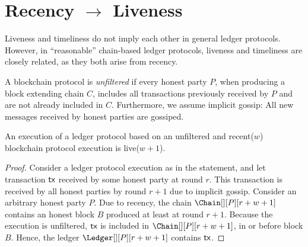\section{Recency $\rightarrow$ Liveness}\label{appendix:recency-liveness}

Liveness and timeliness do not imply each other in general ledger protocols.
However, in ``reasonable'' chain-based ledger protocols, liveness and
timeliness are closely related, as they both arise from recency.

\begin{definition}[Unfiltered]
  A blockchain protocol is \emph{unfiltered} if every honest party $P$,
  when producing a block extending chain $C$, includes all transactions
  previously received by $P$ and are not already included in $C$.
  Furthermore, we assume implicit gossip: All new messages received by honest
  parties are gossiped.
\end{definition}

\begin{theorem}
An execution of a ledger protocol based on an unfiltered and recent($w$)
blockchain protocol execution is live($w + 1$).
\end{theorem}
\begin{proof}
  Consider a ledger protocol execution as in the statement,
  and let transaction $\textsf{tx}$ received by some honest party at round $r$.
  This transaction is received by all honest parties by round $r + 1$ due
  to implicit gossip. Consider an arbitrary honest party $P$. Due to recency,
  the chain $\Chain[][P][r + w + 1]$ contains an honest block $B$ produced at
  least at round $r + 1$. Because the execution is unfiltered, $\textsf{tx}$
  is included in $\Chain[][P][r + w + 1]$, in or before block $B$.
  Hence, the ledger $\Ledger[][P][r + w + 1]$ contains $\textsf{tx}$.
  \Qed
\end{proof}